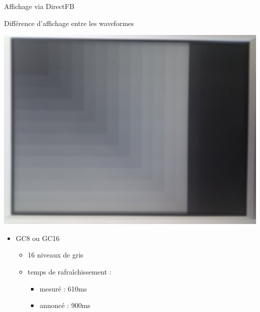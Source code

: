 \begin{frame}{ Affichage via DirectFB }
	\begin{block} { Différence d'affichage entre les waveformes }
		\parbox{0.3\linewidth}{
			\includegraphics[angle=-90,origin=c,scale=0.04]{gc8_4.jpg}
		}
		\parbox{0.6\linewidth}{
			\begin{itemize}
				\item GC8 ou GC16
				\begin{itemize}
					\item 16 niveaux de gris
					\item temps de rafraîchissement : 
					\begin{itemize}
						\item mesuré  : 610ms
						\item annoncé  : 900ms
					\end{itemize}		
				\end{itemize}
			\end{itemize}
		}
	\end{block}
\end{frame}